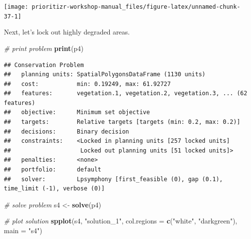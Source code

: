 \documentclass[12pt,]{book}
\newenvironment{Shaded}{\begin{snugshade}}{\end{snugshade}}
\newcommand{\KeywordTok}[1]{\textcolor[rgb]{0.13,0.29,0.53}{\textbf{#1}}}
\newcommand{\DataTypeTok}[1]{\textcolor[rgb]{0.13,0.29,0.53}{#1}}
\newcommand{\FloatTok}[1]{\textcolor[rgb]{0.00,0.00,0.81}{#1}}
\newcommand{\StringTok}[1]{\textcolor[rgb]{0.31,0.60,0.02}{#1}}
\newcommand{\CommentTok}[1]{\textcolor[rgb]{0.56,0.35,0.01}{\textit{#1}}}
\newcommand{\OtherTok}[1]{\textcolor[rgb]{0.56,0.35,0.01}{#1}}
\newcommand{\OperatorTok}[1]{\textcolor[rgb]{0.81,0.36,0.00}{\textbf{#1}}}
\newcommand{\NormalTok}[1]{#1}
\begin{document}
\begin{center}\texttt{[image: prioritizr-workshop-manual\_files/figure-latex/unnamed-chunk-37-1]} \end{center}

Next, let's lock out highly degraded areas.

\begin{Shaded}
\end{Shaded}

\begin{Shaded}
\begin{Highlighting}[]
\CommentTok{# print problem}
\KeywordTok{print}\NormalTok{(p4)}
\end{Highlighting}
\end{Shaded}

\begin{verbatim}
## Conservation Problem
##   planning units: SpatialPolygonsDataFrame (1130 units)
##   cost:           min: 0.19249, max: 61.92727
##   features:       vegetation.1, vegetation.2, vegetation.3, ... (62 features)
##   objective:      Minimum set objective 
##   targets:        Relative targets [targets (min: 0.2, max: 0.2)]
##   decisions:      Binary decision 
##   constraints:    <Locked in planning units [257 locked units]
##                    Locked out planning units [51 locked units]>
##   penalties:      <none>
##   portfolio:      default
##   solver:         Lpsymphony [first_feasible (0), gap (0.1), time_limit (-1), verbose (0)]
\end{verbatim}

\begin{Shaded}
\begin{Highlighting}[]
\CommentTok{# solve problem}
\NormalTok{s4 <-}\StringTok{ }\KeywordTok{solve}\NormalTok{(p4)}

\CommentTok{# plot solution}
\KeywordTok{spplot}\NormalTok{(s4, }\StringTok{"solution_1"}\NormalTok{, }\DataTypeTok{col.regions =} \KeywordTok{c}\NormalTok{(}\StringTok{"white"}\NormalTok{, }\StringTok{"darkgreen"}\NormalTok{), }\DataTypeTok{main =} \StringTok{"s4"}\NormalTok{)}
\end{Highlighting}
\end{Shaded}
\end{document}
